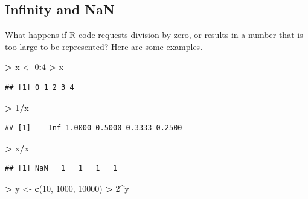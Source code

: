 \documentclass[
]{krantz}
\newenvironment{Shaded}{\begin{snugshade}}{\end{snugshade}}
\newcommand{\DecValTok}[1]{\textcolor[rgb]{0.00,0.00,0.81}{#1}}
\newcommand{\KeywordTok}[1]{\textcolor[rgb]{0.13,0.29,0.53}{\textbf{#1}}}
\newcommand{\NormalTok}[1]{#1}
\newcommand{\OperatorTok}[1]{\textcolor[rgb]{0.81,0.36,0.00}{\textbf{#1}}}
\newcommand{\StringTok}[1]{\textcolor[rgb]{0.31,0.60,0.02}{#1}}
\begin{document}
\hypertarget{infinity-and-nan}{%
\subsection{Infinity and NaN}\label{infinity-and-nan}}

What happens if R code requests division by zero, or results in a number that is too large to be represented? Here are some examples.

\begin{Shaded}
\begin{Highlighting}[]
\OperatorTok{\textgreater{}}\StringTok{ }\NormalTok{x \textless{}{-}}\StringTok{ }\DecValTok{0}\OperatorTok{:}\DecValTok{4}
\OperatorTok{\textgreater{}}\StringTok{ }\NormalTok{x}
\end{Highlighting}
\end{Shaded}

\begin{verbatim}
## [1] 0 1 2 3 4
\end{verbatim}

\begin{Shaded}
\begin{Highlighting}[]
\OperatorTok{\textgreater{}}\StringTok{ }\DecValTok{1}\OperatorTok{/}\NormalTok{x}
\end{Highlighting}
\end{Shaded}

\begin{verbatim}
## [1]    Inf 1.0000 0.5000 0.3333 0.2500
\end{verbatim}

\begin{Shaded}
\begin{Highlighting}[]
\OperatorTok{\textgreater{}}\StringTok{ }\NormalTok{x}\OperatorTok{/}\NormalTok{x}
\end{Highlighting}
\end{Shaded}

\begin{verbatim}
## [1] NaN   1   1   1   1
\end{verbatim}

\begin{Shaded}
\begin{Highlighting}[]
\OperatorTok{\textgreater{}}\StringTok{ }\NormalTok{y \textless{}{-}}\StringTok{ }\KeywordTok{c}\NormalTok{(}\DecValTok{10}\NormalTok{, }\DecValTok{1000}\NormalTok{, }\DecValTok{10000}\NormalTok{)}
\OperatorTok{\textgreater{}}\StringTok{ }\DecValTok{2}\OperatorTok{\^{}}\NormalTok{y}
\end{Highlighting}
\end{Shaded}
\end{document}
